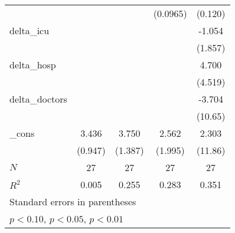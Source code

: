 {\begin{tabular}{l*{4}{c}}
            &                     &                     &    (0.0965)         &     (0.120)         \\
[1em]
delta\_icu   &                     &                     &                     &      -1.054         \\
            &                     &                     &                     &     (1.857)         \\
[1em]
delta\_hosp  &                     &                     &                     &       4.700         \\
            &                     &                     &                     &     (4.519)         \\
[1em]
delta\_doctors&                     &                     &                     &      -3.704         \\
            &                     &                     &                     &     (10.65)         \\
[1em]
\_cons      &       3.436\sym{***}&       3.750\sym{**} &       2.562         &       2.303         \\
            &     (0.947)         &     (1.387)         &     (1.995)         &     (11.86)         \\
\hline
\(N\)       &          27         &          27         &          27         &          27         \\
\(R^{2}\)   &       0.005         &       0.255         &       0.283         &       0.351         \\
\hline\hline
\multicolumn{5}{l}{\footnotesize Standard errors in parentheses}\\
\multicolumn{5}{l}{\footnotesize \sym{*} \(p<0.10\), \sym{**} \(p<0.05\), \sym{***} \(p<0.01\)}\\
\end{tabular}
}
